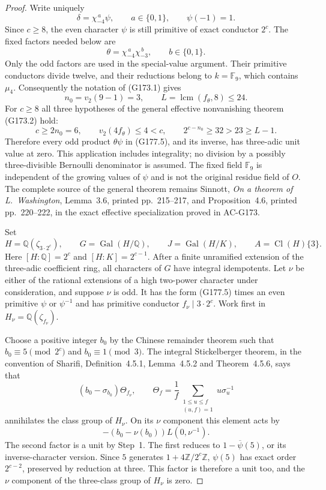 \begin{proof}
Write uniquely
\[
 \delta=\chi_{-4}^{\,a}\psi,\qquad
 a\in\{0,1\},\qquad\psi(-1)=1.
 \tag{G177.4}
\]
Since $c\geq8$, the even character $\psi$ is still primitive of
exact conductor $2^c$.
The fixed factors needed below are
\[
 \theta=\chi_{-4}^{\,a}\chi_{-3}^{\,b},\qquad b\in\{0,1\}.
 \tag{G177.5}
\]
Only the odd factors are used in the special-value argument.
Their primitive conductors divide twelve, and their reductions
belong to $k=\mathbb F_9$, which contains $\mu_4$.
Consequently the notation of (G173.1) gives
\[
 n_0=v_2(9-1)=3,\qquad
 L=\operatorname{lcm}(f_\theta,8)\leq24.
 \tag{G177.6}
\]
For $c\geq8$ all three hypotheses of the general effective
nonvanishing theorem (G173.2) hold:
\[
 c\geq2n_0=6,\qquad v_2(4f_\theta)\leq4<c,\qquad
                  2^{c-n_0}\geq32>23\geq L-1.
 \tag{G177.7}
\]
Therefore every odd product $\theta\psi$ in (G177.5), and its
inverse, has three-adic unit value at zero.
This application includes integrality; no division by a possibly
three-divisible Bernoulli denominator is assumed.
The fixed field $\mathbb F_9$ is independent of the growing values
of $\psi$ and is not the original residue field of $O$.
The complete source of the general theorem remains Sinnott,
\emph{On a theorem of L.~Washington}, Lemma~3.6, printed
pp.~215--217, and Proposition~4.6, printed pp.~220--222, in the
exact effective specialization proved in AC-G173.

Set
\[
 H=\mathbb Q(\zeta_{3\cdot2^c}),\qquad
 G=\operatorname{Gal}(H/\mathbb Q),\qquad
 J=\operatorname{Gal}(H/K),\qquad A=\operatorname{Cl}(H)\{3\}.
 \tag{G177.8}
\]
Here $[H:\mathbb Q]=2^c$ and $[H:K]=2^{c-1}$.
After a finite unramified extension of the three-adic coefficient
ring, all characters of $G$ have integral idempotents.
Let $\nu$ be either of the rational extensions of a high two-power
character under consideration, and suppose $\nu$ is odd.
It has the form (G177.5) times an even primitive $\psi$ or
$\psi^{-1}$ and has primitive conductor $f_\nu\mid3\cdot2^c$.
Work first in $H_\nu=\mathbb Q(\zeta_{f_\nu})$.

Choose a positive integer $b_0$ by the Chinese remainder theorem
such that $b_0\equiv5\pmod {2^c}$ and $b_0\equiv1\pmod3$.
The integral Stickelberger theorem, in the convention of Sharifi,
Definition~4.5.1, Lemma~4.5.2 and Theorem~4.5.6, says that
\[
 (b_0-\sigma_{b_0})\Theta_{f_\nu},\qquad
 \Theta_f=\frac1f\sum_{\substack{1\leq u\leq f\\(u,f)=1}}
                                      u\sigma_u^{-1}
 \tag{G177.9}
\]
annihilates the class group of $H_\nu$.
On its $\nu$ component this element acts by
\[
             -(b_0-\nu(b_0))L(0,\nu^{-1}).
 \tag{G177.10}
\]
The second factor is a unit by Step~1.
The first reduces to $1-\overline\psi(5)$, or its inverse-character
version.  Since $5$ generates $1+4\mathbb Z/2^c\mathbb Z$,
$\psi(5)$ has exact order $2^{c-2}$, preserved by reduction at
three.  This factor is therefore a unit too, and the $\nu$
component of the three-class group of $H_\nu$ is zero.


\end{proof}

